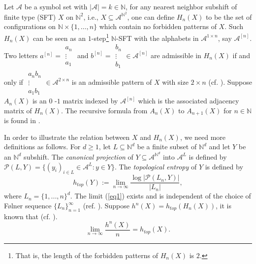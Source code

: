 \documentclass{amsart}
\theoremstyle{definition}
\begin{document}
Let $\mathcal{A}$ be a symbol set with $\left\vert \mathcal{A}\right\vert
=k\in \mathbb{N}$, for any nearest neighbor subshift of finite type (SFT) $X$ on 
$\mathbb{N}^{2}$, i.e., $X\subseteq \mathcal{A}^{\mathbb{N}^{2}}$, one can
define $H_{n}(X)$ to be the set of configurations on $\mathbb{N\times }%
\{1,\ldots ,n\}$ which contain no forbidden patterns of $X$. Such $H_{n}(X)$
can be seen as an $1$-step\footnote{%
That is, the length of the forbidden patterns of $H_{n}(X)$ is $2$.} $%
\mathbb{N}$-SFT with the alphabets in $\mathcal{A}^{1\times n}$, say $\mathcal{A}^{[n]}$. Two letters $a^{[n]}=%
\begin{array}{c}
a_{n} \\ 
\vdots  \\ 
a_{1}%
\end{array}%
$ and $b^{[n]}=%
\begin{array}{c}
b_{n} \\ 
\vdots  \\ 
b_{1}%
\end{array}%
\in \mathcal{A}^{[n]}$ are admissible in $H_{n}(X)$ if and only if $%
\begin{array}{c}
a_{n}b_{n} \\ 
\vdots  \\ 
a_{1}b_{1}%
\end{array}%
\in \mathcal{A}^{2\times n}$ is an admissible pattern of $X$ with size $%
2\times n$ (cf. \cite{pavlov2012approximating}). Suppose $A_{n}(X)$ is an $0$%
-$1$ matrix indexed by $\mathcal{A}^{[n]}$ which is the associated adjacency
matrix of $H_{n}(X)$. The recursive formula from $A_{n}(X)$ to $A_{n+1}(X)$
for $n\in \mathbb{N}$ is found in \cite{ban2005patterns,
pierce2008computing, markley70maximal}. 

In order to illustrate the relation between $X$ and $H_n(X)$, we need more definitions as follows. For $d\geq 1$, let $L\subseteq \mathbb{N}^d$ be a finite subset of $\mathbb{N}^d$ and let $Y$ be an $\mathbb{N}^d$ subshift. The \emph{canonical projection} of $Y\subseteq \mathcal{A}^{\mathbb{N}^d}$ into $\mathcal{A}^L$ is defined by $\mathcal{P}(L,Y)=\{ (y_i)_{i\in L}\in \mathcal{A}^L: y\in Y\}$. The \emph{topological entropy} of $Y$ is defined by
\begin{equation}\label{eq1}
   h_{top}(Y):=\lim_{n\to\infty}\frac{\log \left|\mathcal{P}(L_n,Y)\right|}{\left|L_n\right|}, 
\end{equation}
where $L_n=\{1,...,n\}^d$. The limit (\ref{eq1}) exists and is independent of the choice of F\o{}lner sequence $\{L_n\}_{n=1}^\infty$ (ref. \cite{ceccherini2010cellular}). Suppose $h^{n}(X)=h_{top}(H_n(X))$, it
is known that (cf. \cite{pavlov2012approximating, ban2005patterns,
pierce2008computing}). 
\begin{equation}
\lim_{n\rightarrow \infty }\frac{h^{n}(X)}{n}=h_{top}(X).  \label{2}
\end{equation}
\end{document}
